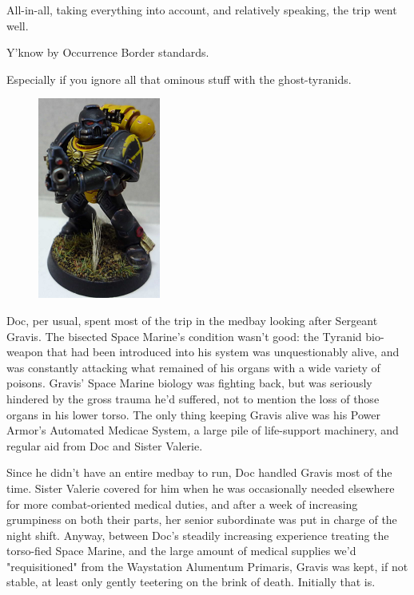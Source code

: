 All-in-all, taking everything into account, and relatively speaking, the trip went well. 


Y'know by Occurrence Border standards. 


Especially if you ignore all that ominous stuff with the ghost-tyranids.


\begin{figure}
	\begin{center}
		\includegraphics[width=\figwidth]{pics/15/7.png}
	\end{center}
\end{figure}
Doc, per usual, spent most of the trip in the medbay looking after Sergeant Gravis. 
The bisected Space Marine's condition wasn't good: 
the Tyranid bio-weapon that had been introduced into his system was unquestionably alive, and was constantly attacking what remained of his organs with a wide variety of poisons. 
Gravis' Space Marine biology was fighting back, but was seriously hindered by the gross trauma he'd suffered, not to mention the loss of those organs in his lower torso. 
The only thing keeping Gravis alive was his Power Armor's Automated Medicae System, a large pile of life-support machinery, and regular aid from Doc and Sister Valerie.

Since he didn't have an entire medbay to run, Doc handled Gravis most of the time. 
Sister Valerie covered for him when he was occasionally needed elsewhere for more combat-oriented medical duties, and after a week of increasing grumpiness on both their parts, her senior subordinate was put in charge of the night shift. 
Anyway, between Doc's steadily increasing experience treating the torso-fied Space Marine, and the large amount of medical supplies we'd "requisitioned" from the Waystation Alumentum Primaris, Gravis was kept, if not stable, at least only gently teetering on the brink of death. 
Initially that is.

